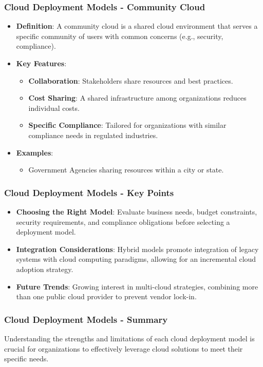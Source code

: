 \documentclass[aspectratio=169]{beamer}
\begin{document}
\begin{frame}[fragile]
    \frametitle{Cloud Deployment Models - Community Cloud}
    \begin{itemize}
        \item \textbf{Definition}: A community cloud is a shared cloud environment that serves a specific community of users with common concerns (e.g., security, compliance).
        \item \textbf{Key Features}:
            \begin{itemize}
                \item \textbf{Collaboration}: Stakeholders share resources and best practices.
                \item \textbf{Cost Sharing}: A shared infrastructure among organizations reduces individual costs.
                \item \textbf{Specific Compliance}: Tailored for organizations with similar compliance needs in regulated industries.
            \end{itemize}
        \item \textbf{Examples}:
            \begin{itemize}
                \item Government Agencies sharing resources within a city or state.
            \end{itemize}
    \end{itemize}
\end{frame}

\begin{frame}[fragile]
    \frametitle{Cloud Deployment Models - Key Points}
    \begin{itemize}
        \item \textbf{Choosing the Right Model}: Evaluate business needs, budget constraints, security requirements, and compliance obligations before selecting a deployment model.
        \item \textbf{Integration Considerations}: Hybrid models promote integration of legacy systems with cloud computing paradigms, allowing for an incremental cloud adoption strategy.
        \item \textbf{Future Trends}: Growing interest in multi-cloud strategies, combining more than one public cloud provider to prevent vendor lock-in.
    \end{itemize}
\end{frame}

\begin{frame}[fragile]
    \frametitle{Cloud Deployment Models - Summary}
    Understanding the strengths and limitations of each cloud deployment model is crucial for organizations to effectively leverage cloud solutions to meet their specific needs.
\end{frame}
\end{document}
